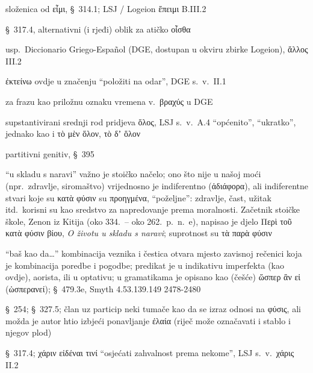 \begin{description}[noitemsep]
\item[ἔπιθι] složenica od εἶμι, §~314.1; LSJ / Logeion ἔπειμι B.III.2
\item[οἶδας] §~317.4, alternativni (i rjeđi) oblik za atičko οἶσθα
\item[ἄλλον ἐπ' ἄλλῳ] usp.\ Diccionario Griego-Español (DGE, dostupan u okviru zbirke Logeion), ἄλλος III.2
\item[ἐξετάθη] ἐκτείνω ovdje u značenju ``položiti na odar'', DGE s.~v.\ II.1
\item[ἐν βραχεῖ] za frazu kao priložnu oznaku vremena v.\ βραχύς u DGE
\end{description}


\begin{description}[noitemsep]
\item[τὸ γὰρ ὅλον] supstantivirani srednji rod pridjeva ὅλος, LSJ s.~v.\ A.4 ``općenito'', ``ukratko'', jednako kao i τὸ μὲν ὅλον, τὸ δʼ ὅλον
\end{description}

\begin{description}[noitemsep]
\item[τοῦτο τοῦ χρόνου] partitivni genitiv, §~395
\item[κατὰ φύσιν] ``u skladu s naravi'' važno je stoičko načelo; ono što nije u našoj moći (npr.\ zdravlje, siromaštvo) vrijednosno je indiferentno (ἀδιάφορα), ali indiferentne stvari koje su κατὰ φύσιν su προηγμένα, ``poželjne'': zdravlje, čast, užitak itd.\ korisni su kao sredstvo za napredovanje prema moralnosti. Začetnik stoičke škole, Zenon iz Kitija (oko 334.\ – oko 262.\ p.~n.~e), napisao je djelo Περὶ τοῦ κατὰ φύσιν βίου, \textit{O životu u skladu s naravi}; suprotnost su τὰ παρὰ φύσιν
\item[ὡς ἂν εἰ] ``baš kao da\dots'' kombinacija veznika i čestica otvara mjesto zavisnoj rečenici koja je kombinacija poredbe i pogodbe; predikat je u indikativu imperfekta (kao ovdje), aorista, ili u optativu; u gramatikama je opisano kao (češće) ὥσπερ ἂν εἰ (ὡσπερανεί); §~479.3e, Smyth 4.53.139.149 2478-2480
\item[τὴν ἐνεγκοῦσαν] §~254; §~327.5; član uz particip neki tumače kao da se izraz odnosi na φύσις, ali možda je autor htio izbjeći ponavljanje ἐλαία (riječ može označavati i stablo i njegov plod)
\item[εἰδυῖα] §~317.4; χάριν εἰδέναι τινί ``osjećati zahvalnost prema nekome'', LSJ s.~v.\ χάρις II.2
\end{description}


